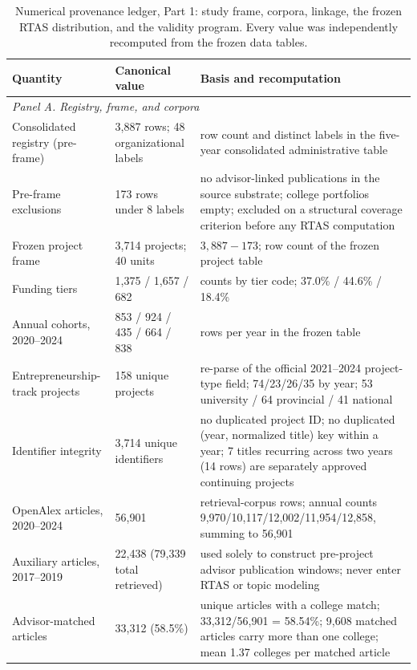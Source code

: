 \begin{table}[H]
\centering
\caption{Numerical provenance ledger, Part 1: study frame, corpora, linkage, the frozen RTAS distribution, and the validity program. Every value was independently recomputed from the frozen data tables.}
\label{tab:s3}
\scriptsize
\begin{tabular}{p{1.55in}p{1.05in}p{3.15in}}
\toprule
\textbf{Quantity} & \textbf{Canonical value} & \textbf{Basis and recomputation}\\
\midrule
\multicolumn{3}{l}{\textit{Panel A. Registry, frame, and corpora}}\\
\midrule
Consolidated registry (pre-frame) & 3,887 rows; 48 organizational labels & row count and distinct labels in the five-year consolidated administrative table\\
Pre-frame exclusions & 173 rows under 8 labels & no advisor-linked publications in the source substrate; college portfolios empty; excluded on a structural coverage criterion before any RTAS computation\\
Frozen project frame & 3,714 projects; 40 units & $3{,}887-173$; row count of the frozen project table\\
Funding tiers & 1,375 / 1,657 / 682 & counts by tier code; 37.0\% / 44.6\% / 18.4\%\\
Annual cohorts, 2020--2024 & 853 / 924 / 435 / 664 / 838 & rows per year in the frozen table\\
Entrepreneurship-track projects & 158 unique projects & re-parse of the official 2021--2024 project-type field; 74/23/26/35 by year; 53 university / 64 provincial / 41 national\\
Identifier integrity & 3,714 unique identifiers & no duplicated project ID; no duplicated (year, normalized title) key within a year; 7 titles recurring across two years (14 rows) are separately approved continuing projects\\
OpenAlex articles, 2020--2024 & 56,901 & retrieval-corpus rows; annual counts 9,970/10,117/12,002/11,954/12,858, summing to 56,901\\
Auxiliary articles, 2017--2019 & 22,438 (79,339 total retrieved) & used solely to construct pre-project advisor publication windows; never enter RTAS or topic modeling\\
Advisor-matched articles & 33,312 (58.5\%) & unique articles with a college match; 33,312/56,901 = 58.54\%; 9,608 matched articles carry more than one college; mean 1.37 colleges per matched article\\

\end{tabular}
\end{table}
